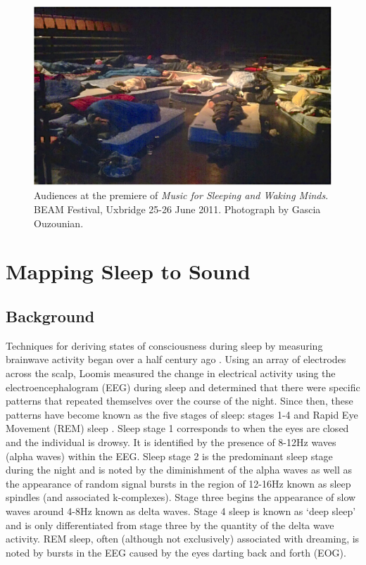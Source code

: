 \begin{figure}[t]
\centering
\includegraphics[width=\textwidth]{img-1.jpg}
\caption{Audiences at the premiere of \emph{Music for Sleeping and Waking Minds}. BEAM Festival, Uxbridge 25-26 June 2011. Photograph by Gascia Ouzounian.}
\end{figure}

\section{Mapping Sleep to Sound}

\subsection{Background}

Techniques for deriving states of consciousness during sleep by measuring brainwave activity began over a half century ago \cite{Loomis:1937}. Using an array of electrodes across the scalp, Loomis measured the change in electrical activity using the electroencephalogram (EEG) during sleep and determined that there were specific patterns that repeated themselves over the course of the night.  Since then, these patterns have become known as the five stages of sleep: stages 1-4 and Rapid Eye Movement (REM) sleep \cite{Dement:1957}. Sleep stage 1 corresponds to when the eyes are closed and the individual is drowsy. It is identified by the presence of 8-12Hz waves (alpha waves) within the EEG. Sleep stage 2 is the predominant sleep stage during the night and is noted by the diminishment of the alpha waves as well as the appearance of random signal bursts in the region of 12-16Hz known as sleep spindles (and associated k-complexes). Stage three begins the appearance of slow waves around 4-8Hz known as delta waves.  Stage 4 sleep is known as `deep sleep' and is only differentiated from stage three by the quantity of the delta wave activity. REM sleep, often (although not exclusively) associated with dreaming, is noted by bursts in the EEG caused by the eyes darting back and forth (EOG).

